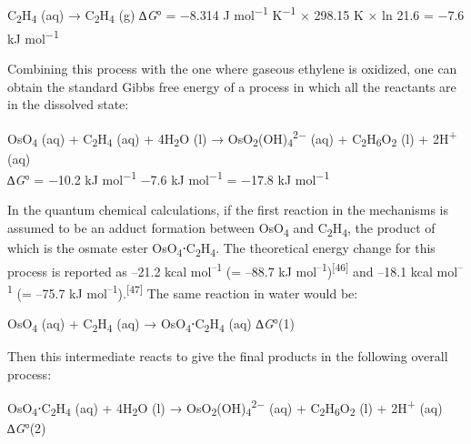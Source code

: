 \documentclass{article}
\begin{document}
\begin{center}
C\textsubscript{2}H\textsubscript{4} (aq) → C\textsubscript{2}H\textsubscript{4} (g) \quad ∆\emph{G}° = −8.314 J mol\textsuperscript{−1} K\textsuperscript{−1} × 298.15 K × ln 21.6 = −7.6 kJ mol\textsuperscript{−1}
\end{center}

Combining this process with the one where gaseous ethylene is oxidized, one can obtain the standard Gibbs free energy of a process in which all the reactants are in the dissolved state:

\begin{center}
OsO\textsubscript{4} (aq) + C\textsubscript{2}H\textsubscript{4} (aq) + 4H\textsubscript{2}O (l) → OsO\textsubscript{2}(OH)\textsubscript{4}\textsuperscript{2−} (aq) + C\textsubscript{2}H\textsubscript{6}O\textsubscript{2} (l) + 2H\textsuperscript{+} (aq)\\[2pt]
∆\emph{G}° = −10.2 kJ mol\textsuperscript{−1} −7.6 kJ mol\textsuperscript{−1} = −17.8 kJ mol\textsuperscript{−1}
\end{center}

In the quantum chemical calculations, if the first reaction in the mechanisms is assumed to be an adduct formation between OsO\textsubscript{4} and C\textsubscript{2}H\textsubscript{4}, the product of which is the osmate ester OsO\textsubscript{4}⋅C\textsubscript{2}H\textsubscript{4}. The theoretical energy change for this process is reported as –21.2 kcal mol\textsuperscript{–1} (= –88.7 kJ mol\textsuperscript{–1})\textsuperscript{[46]} and –18.1 kcal mol\textsuperscript{–1} (= –75.7 kJ mol\textsuperscript{–1}).\textsuperscript{[47]} The same reaction in water would be:

\begin{center}
OsO\textsubscript{4} (aq) + C\textsubscript{2}H\textsubscript{4} (aq) → OsO\textsubscript{4}⋅C\textsubscript{2}H\textsubscript{4} (aq) \quad ∆\emph{G}°(1)
\end{center}

Then this intermediate reacts to give the final products in the following overall process:

\begin{center}
OsO\textsubscript{4}⋅C\textsubscript{2}H\textsubscript{4} (aq) + 4H\textsubscript{2}O (l) → OsO\textsubscript{2}(OH)\textsubscript{4}\textsuperscript{2−} (aq) + C\textsubscript{2}H\textsubscript{6}O\textsubscript{2} (l) + 2H\textsuperscript{+} (aq) \quad ∆\emph{G}°(2)
\end{center}
\end{document}

